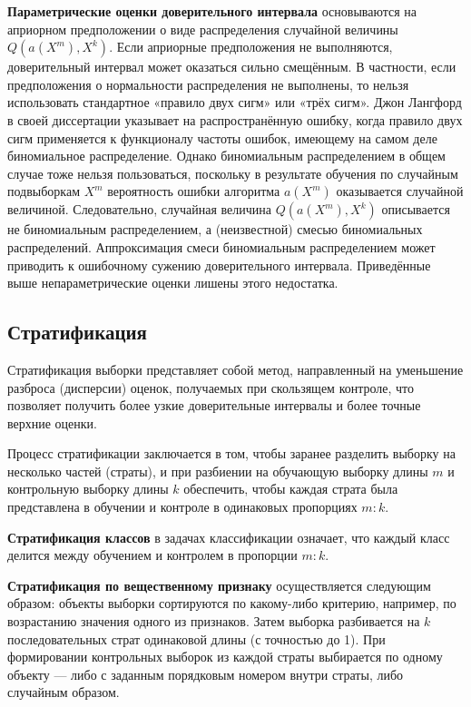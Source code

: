 \textbf{Параметрические оценки доверительного интервала} основываются на априорном предположении о виде распределения случайной величины $Q(a(X^m), X^k)$. Если априорные предположения не выполняются, доверительный интервал может оказаться сильно смещённым. В частности, если предположения о нормальности распределения не выполнены, то нельзя использовать стандартное «правило двух сигм» или «трёх сигм». Джон Лангфорд в своей диссертации \cite{Langford2002} указывает на распространённую ошибку, когда правило двух сигм применяется к функционалу частоты ошибок, имеющему на самом деле биномиальное распределение. Однако биномиальным распределением в общем случае тоже нельзя пользоваться, поскольку в результате обучения по случайным подвыборкам $X^m$ вероятность ошибки алгоритма $a(X^m)$ оказывается случайной величиной. Следовательно, случайная величина $Q(a(X^m), X^k)$ описывается не биномиальным распределением, а (неизвестной) смесью биномиальных распределений. Аппроксимация смеси биномиальным распределением может приводить к ошибочному сужению доверительного интервала. Приведённые выше непараметрические оценки лишены этого недостатка.

\subsection{Стратификация}

Стратификация выборки представляет собой метод, направленный на уменьшение разброса (дисперсии) оценок, получаемых при скользящем контроле, что позволяет получить более узкие доверительные интервалы и более точные верхние оценки.

Процесс стратификации заключается в том, чтобы заранее разделить выборку на несколько частей (страты), и при разбиении на обучающую выборку длины $m$ и контрольную выборку длины $k$ обеспечить, чтобы каждая страта была представлена в обучении и контроле в одинаковых пропорциях $m:k$.

\textbf{Стратификация классов} в задачах классификации означает, что каждый класс делится между обучением и контролем в пропорции $m:k$.

\textbf{Стратификация по вещественному признаку} осуществляется следующим образом: объекты выборки сортируются по какому-либо критерию, например, по возрастанию значения одного из признаков. Затем выборка разбивается на $k$ последовательных страт одинаковой длины (с точностью до 1). При формировании контрольных выборок из каждой страты выбирается по одному объекту — либо с заданным порядковым номером внутри страты, либо случайным образом.


